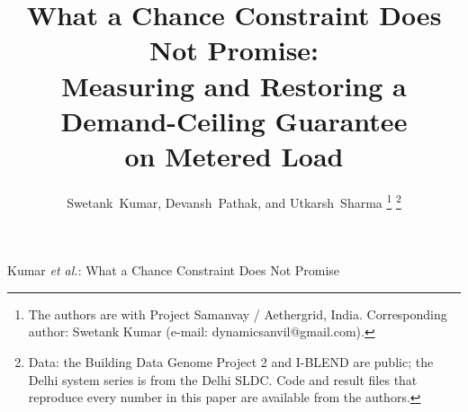 \documentclass[journal]{IEEEtran}
\begin{document}
\title{What a Chance Constraint Does Not Promise:\\
Measuring and Restoring a Demand-Ceiling Guarantee\\
on Metered Load}

\author{Swetank~Kumar, Devansh~Pathak, and Utkarsh~Sharma%
\thanks{%
The authors are with Project Samanvay / Aethergrid, India. Corresponding
author: Swetank Kumar (e-mail: dynamicsanvil@gmail.com).}%
\thanks{%
Data: the Building Data Genome Project 2 and I-BLEND are public; the Delhi
system series is from the Delhi SLDC. Code and result files that reproduce
every number in this paper are available from the authors.}}

%
{Kumar \MakeLowercase{\textit{et al.}}: What a Chance Constraint Does Not Promise}

\maketitle
\end{document}
